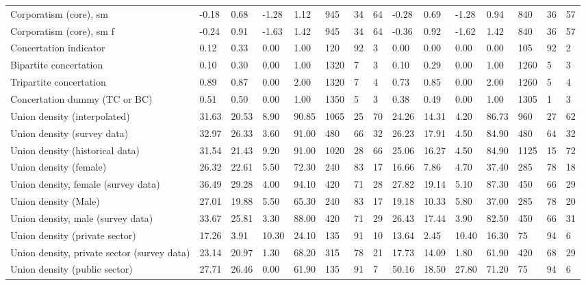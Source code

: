 \begin{longtable}{lllllllllllllll}
\addlinespace
Corporatism (core), sm & -0.18 & 0.68 & -1.28 & 1.12 & 945 & 34 & 64 & -0.28 & 0.69 & -1.28 & 0.94 & 840 & 36 & 57\\
Corporatism (core), sm f & -0.24 & 0.91 & -1.63 & 1.42 & 945 & 34 & 64 & -0.36 & 0.92 & -1.62 & 1.42 & 840 & 36 & 57\\
Concertation indicator & 0.12 & 0.33 & 0.00 & 1.00 & 120 & 92 & 3 & 0.00 & 0.00 & 0.00 & 0.00 & 105 & 92 & 2\\
Bipartite concertation & 0.10 & 0.30 & 0.00 & 1.00 & 1320 & 7 & 3 & 0.10 & 0.29 & 0.00 & 1.00 & 1260 & 5 & 3\\
Tripartite concertation & 0.89 & 0.87 & 0.00 & 2.00 & 1320 & 7 & 4 & 0.73 & 0.85 & 0.00 & 2.00 & 1260 & 5 & 4\\
\addlinespace
Concertation dummy (TC or BC) & 0.51 & 0.50 & 0.00 & 1.00 & 1350 & 5 & 3 & 0.38 & 0.49 & 0.00 & 1.00 & 1305 & 1 & 3\\
Union density (interpolated) & 31.63 & 20.53 & 8.90 & 90.85 & 1065 & 25 & 70 & 24.26 & 14.31 & 4.20 & 86.73 & 960 & 27 & 62\\
Union density (survey data) & 32.97 & 26.33 & 3.60 & 91.00 & 480 & 66 & 32 & 26.23 & 17.91 & 4.50 & 84.90 & 480 & 64 & 32\\
Union density (historical data) & 31.54 & 21.43 & 9.20 & 91.00 & 1020 & 28 & 66 & 25.06 & 16.27 & 4.50 & 84.90 & 1125 & 15 & 72\\
Union density (female) & 26.32 & 22.61 & 5.50 & 72.30 & 240 & 83 & 17 & 16.66 & 7.86 & 4.70 & 37.40 & 285 & 78 & 18\\
\addlinespace
Union density, female (survey data) & 36.49 & 29.28 & 4.00 & 94.10 & 420 & 71 & 28 & 27.82 & 19.14 & 5.10 & 87.30 & 450 & 66 & 29\\
Union density (Male) & 27.01 & 19.88 & 5.50 & 65.30 & 240 & 83 & 17 & 19.18 & 10.33 & 5.80 & 37.00 & 285 & 78 & 20\\
Union density, male (survey data) & 33.67 & 25.81 & 3.30 & 88.00 & 420 & 71 & 29 & 26.43 & 17.44 & 3.90 & 82.50 & 450 & 66 & 31\\
Union density (private sector) & 17.26 & 3.91 & 10.30 & 24.10 & 135 & 91 & 10 & 13.64 & 2.45 & 10.40 & 16.30 & 75 & 94 & 6\\
Union density, private sector (survey data) & 23.14 & 20.97 & 1.30 & 68.20 & 315 & 78 & 21 & 17.73 & 14.09 & 1.80 & 61.90 & 420 & 68 & 29\\
\addlinespace
Union density (public sector) & 27.71 & 26.46 & 0.00 & 61.90 & 135 & 91 & 7 & 50.16 & 18.50 & 27.80 & 71.20 & 75 & 94 & 6\\

\end{longtable}
